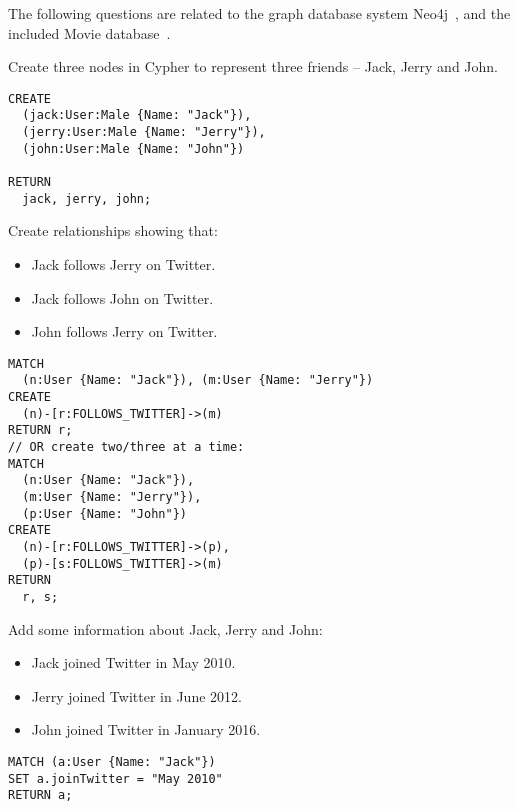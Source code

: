 \documentclass[a4paper,12pt]{exam}
\begin{document}
\printanswers

\noindent
The following questions are related to the graph database system Neo4j~\cite{neo4j}, and the included Movie database~\cite{moviedb}.

\begin{questions}

\question
Create three nodes in Cypher to represent three friends -- Jack, Jerry and John.
\begin{solution}
  \begin{verbatim}
CREATE
  (jack:User:Male {Name: "Jack"}), 
  (jerry:User:Male {Name: "Jerry"}),
  (john:User:Male {Name: "John"})

RETURN
  jack, jerry, john;
  \end{verbatim}
\end{solution}
  
\question
Create relationships showing that:

\begin{itemize}
  \item Jack follows Jerry on Twitter.
  \item Jack follows John on Twitter.
  \item John follows Jerry on Twitter.
\end{itemize}

\begin{solution}
  \begin{verbatim}
MATCH
  (n:User {Name: "Jack"}), (m:User {Name: "Jerry"})
CREATE
  (n)-[r:FOLLOWS_TWITTER]->(m)
RETURN r;
// OR create two/three at a time:
MATCH 
  (n:User {Name: "Jack"}),
  (m:User {Name: "Jerry"}),
  (p:User {Name: "John"})
CREATE
  (n)-[r:FOLLOWS_TWITTER]->(p),
  (p)-[s:FOLLOWS_TWITTER]->(m)
RETURN
  r, s;
  \end{verbatim}
\end{solution}

\question
Add some information about Jack, Jerry and John:
\begin{itemize}
  \item Jack joined Twitter in May 2010.
  \item Jerry joined Twitter in June 2012.
  \item John joined Twitter in January 2016.
\end{itemize}

\begin{solution}
\begin{verbatim}
MATCH (a:User {Name: "Jack"})
SET a.joinTwitter = "May 2010"
RETURN a;


\end{verbatim}
\end{solution}
\end{questions}
\end{document}
